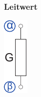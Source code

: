 \documentclass[a4paper,twocolumn,10pt]{article}
\begin{document}
\subsubsection*{Leitwert}
\begin{minipage}[b]{0.05\textwidth}
\includegraphics[width=\textwidth]{Grafiken/KSA_Widerstand}
\end{minipage}
\end{document}
